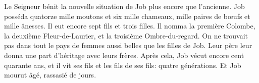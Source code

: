 Le Seigneur bénit la nouvelle situation de Job plus encore que l’ancienne.
Job posséda quatorze mille moutons et six mille chameaux,
	mille paires de bœufs et mille ânesses.
Il eut encore sept fils et trois filles.
Il nomma la première Colombe,
	la deuxième Fleur-de-Laurier,
	et la troisième Ombre-du-regard.
On ne trouvait pas dans tout le pays de femmes aussi belles que les filles de Job.
	Leur père leur donna une part d’héritage avec leurs frères.
Après cela, Job vécut encore cent quarante ans,
	et il vit ses fils et les fils de ses fils: quatre générations.
	Et Job mourut âgé, rassasié de jours.
